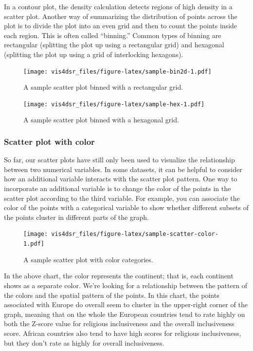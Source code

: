 \documentclass[
]{krantz}
\begin{document}
In a contour plot, the density calculation detects regions of high density in a
scatter plot. Another way of summarizing the distribution of points across the plot
is to divide the plot into an even grid and then to count the points inside each
region. This is often called ``binning.'' Common types of binning are rectangular
(splitting the plot up using a rectangular grid) and hexagonal (splitting the
plot up using a grid of interlocking hexagons).

\begin{figure}
\centering
\texttt{[image: vis4dsr\_files/figure-latex/sample-bin2d-1.pdf]}
\caption{\label{fig:sample-bin2d}A sample scatter plot binned with a rectangular grid.}
\end{figure}

\begin{figure}
\centering
\texttt{[image: vis4dsr\_files/figure-latex/sample-hex-1.pdf]}
\caption{\label{fig:sample-hex}A sample scatter plot binned with a hexagonal grid.}
\end{figure}

\hypertarget{scatter-plot-with-color}{%
\subsubsection{Scatter plot with color}\label{scatter-plot-with-color}}

So far, our scatter plots have still only been used to visualize the relationship
between two numerical variables. In some datasets, it can be helpful to consider
how an additional variable interacts with the scatter plot pattern. One way to
incorporate an additional variable is to change the color of the points in the
scatter plot according to the third variable. For example, you can associate the
color of the points with a categorical variable to show whether different subsets
of the points cluster in different parts of the graph.

\begin{figure}
\centering
\texttt{[image: vis4dsr\_files/figure-latex/sample-scatter-color-1.pdf]}
\caption{\label{fig:sample-scatter-color}A sample scatter plot with color categories.}
\end{figure}

In the above chart, the color represents the continent; that is, each continent shows
as a separate color. We're looking for a relationship between the pattern of the colors
and the spatial pattern of the points. In this chart, the points associated with
Europe do overall seem to cluster in the upper-right corner of the graph, meaning that
on the whole the European countries tend to rate highly on both the Z-score value
for religious inclusiveness and the overall inclusiveness score. African countries
also tend to have high scores for religious inclusiveness, but they don't rate as
highly for overall inclusiveness.
\end{document}
